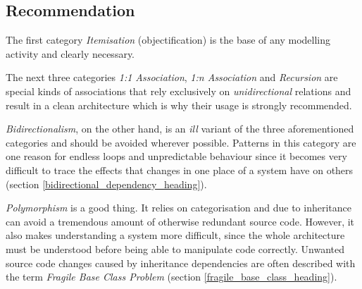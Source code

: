 %
%
%
%
%
%
%

\subsection{Recommendation}
\label{recommendation_heading}

The first category \emph{Itemisation} (objectification) is the base of any
modelling activity and clearly necessary.

The next three categories \emph{1:1 Association}, \emph{1:n Association} and
\emph{Recursion} are special kinds of associations that rely exclusively on
\emph{unidirectional} relations and result in a clean architecture which is why
their usage is strongly recommended.

\emph{Bidirectionalism}, on the other hand, is an \emph{ill} variant of the three
aforementioned categories and should be avoided wherever possible. Patterns in
this category are one reason for endless loops and unpredictable behaviour since
it becomes very difficult to trace the effects that changes in one place of a
system have on others (section \ref{bidirectional_dependency_heading}).

\emph{Polymorphism} is a good thing. It relies on categorisation and due to
inheritance can avoid a tremendous amount of otherwise redundant source code.
However, it also makes understanding a system more difficult, since the whole
architecture must be understood before being able to manipulate code correctly.
Unwanted source code changes caused by inheritance dependencies are often
described with the term \emph{Fragile Base Class Problem} (section
\ref{fragile_base_class_heading}).


